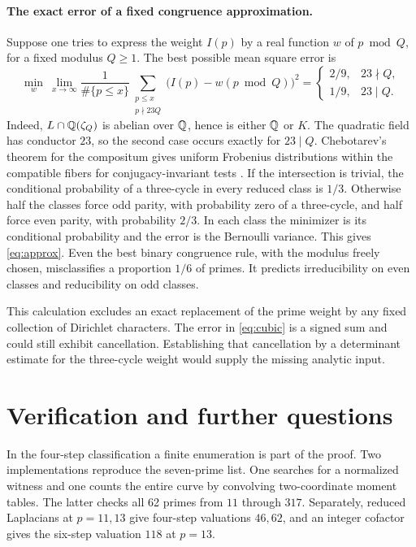 \paragraph{The exact error of a fixed congruence approximation.}
Suppose one tries to express the weight $I(p)$ by a real function $w$ of $p\bmod Q$, for a fixed modulus $Q\ge1$. The best possible mean square error is
\begin{equation}
 \min_w\ \lim_{x\to\infty}\frac{1}{\#\{p\le x\}}
 \sum_{\substack{p\le x\\p\nmid23Q}}\!\big(I(p)-w(p\bmod Q)\big)^2
   =
 \begin{cases} 2/9,&23\nmid Q,\\ 1/9,&23\mid Q. \end{cases}       \label{eq:approx}
\end{equation}
Indeed, $L\cap\mathbb Q(\zeta_Q)$ is abelian over $\mathbb Q$, hence is either $\mathbb Q$ or $K$. The quadratic field has conductor $23$, so the second case occurs exactly for $23\mid Q$. Chebotarev's theorem for the compositum gives uniform Frobenius distributions within the compatible fibers for conjugacy-invariant tests \cite{cheb}. If the intersection is trivial, the conditional probability of a three-cycle in every reduced class is $1/3$. Otherwise half the classes force odd parity, with probability zero of a three-cycle, and half force even parity, with probability $2/3$. In each class the minimizer is its conditional probability and the error is the Bernoulli variance. This gives \eqref{eq:approx}. Even the best binary congruence rule, with the modulus freely chosen, misclassifies a proportion $1/6$ of primes. It predicts irreducibility on even classes and reducibility on odd classes.

This calculation excludes an exact replacement of the prime weight by any fixed collection of Dirichlet characters. The error in \eqref{eq:cubic} is a signed sum and could still exhibit cancellation. Establishing that cancellation by a determinant estimate for the three-cycle weight would supply the missing analytic input.

\section{Verification and further questions}
In the four-step classification a finite enumeration is part of the proof. Two implementations reproduce the seven-prime list. One searches for a normalized witness and one counts the entire curve by convolving two-coordinate moment tables. The latter checks all 62 primes from $11$ through $317$. Separately, reduced Laplacians at $p=11,13$ give four-step valuations $46,62$, and an integer cofactor gives the six-step valuation $118$ at $p=13$.

